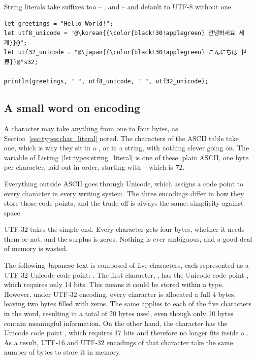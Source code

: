 String literals take suffixes too -- ,  and  --
and default to UTF-8 without one.

\begin{lstlisting}[style=coloredverbatim, label=lst:types:string_literal, caption=Example of string literals, escapechar=@]
let greetings = "Hello World!";
let utf8_unicode = "@\korean{{\color{black!30!applegreen} 안녕하세요 세계}}@";
let utf32_unicode = "@\japan{{\color{black!30!applegreen} こんにちは 世界}}@"s32;

println(greetings, " ", utf8_unicode, " ", utf32_unicode);
\end{lstlisting}

\subsection{A small word on encoding}
\label{sec:types:encoding}

A character may take anything from one to four bytes, as
Section~\ref{sec:types:char_literal} noted. The characters of the ASCII table
take one, which is why they sit in a , or in a \token{[c8]} string,
with nothing clever going on. The  variable of
Listing~\ref{lst:types:string_literal} is one of these: plain ASCII, one byte per
character, laid out in order, starting with  -- which is $72$.




Everything outside ASCII goes through Unicode, which assigns a code point to
every character in every writing system. The three encodings differ in how they
store those code points, and the trade-off is always the same: simplicity against
space.

UTF-32 takes the simple end. Every character gets four bytes, whether it needs
them or not, and the surplus is zeros. Nothing is ever ambiguous, and a good deal
of memory is wasted.



The following Japanese text \colorbox{background!90!gray!60}{}
is composed of five characters, each represented as a UTF‑32
Unicode code point: . The first
character, \colorbox{background!90!gray!60}{}, has the Unicode code point
, which requires only 14 bits. This means it could be stored
within a  type. However, under UTF‑32 encoding, every character is
allocated a full 4 bytes, leaving two bytes filled with zeros. The same
applies to each of the five characters in the word, resulting in a total of 20
bytes used, even though only 10 bytes contain meaningful information. On the
other hand, the character  has the Unicode code point
, which requires 17 bits and therefore no longer fits inside a
. As a result, UTF‑16 and UTF‑32 encodings of that character take
the same number of bytes to store it in memory.



